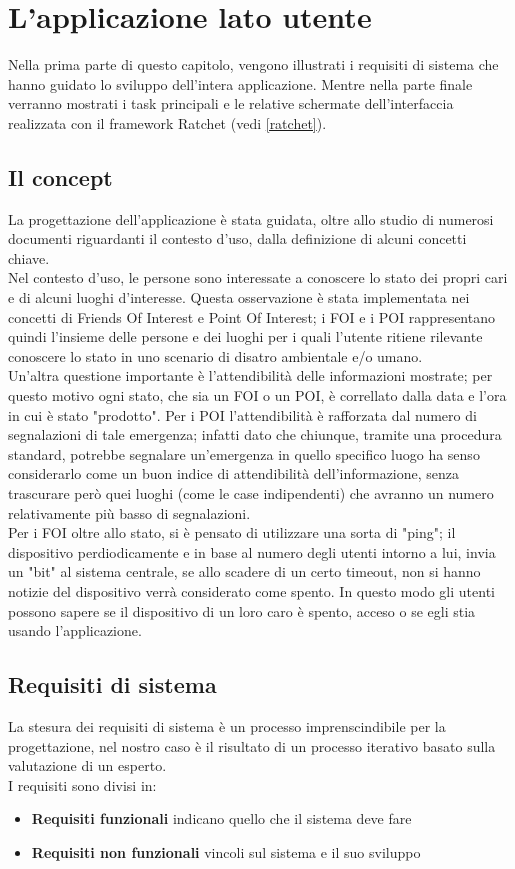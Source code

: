 \chapter{L'applicazione lato utente}
Nella prima parte di questo capitolo, vengono illustrati i requisiti di sistema che hanno guidato lo sviluppo dell'intera applicazione. Mentre nella parte finale verranno mostrati i task principali e le relative schermate dell'interfaccia realizzata con il framework Ratchet (vedi \ref{ratchet}).
\section{Il concept}
La progettazione dell'applicazione è stata guidata, oltre allo studio di numerosi documenti riguardanti il contesto d'uso, dalla definizione di alcuni concetti chiave. \\
Nel contesto d'uso, le persone sono interessate a conoscere lo stato dei propri cari e di alcuni luoghi d'interesse. Questa osservazione è stata implementata nei concetti di Friends Of Interest e Point Of Interest; i FOI e i POI rappresentano quindi l'insieme delle persone e dei luoghi per i quali l'utente ritiene rilevante conoscere lo stato in uno scenario di disatro ambientale e/o umano.\\
Un'altra questione importante è l'attendibilità delle informazioni mostrate; per questo motivo ogni stato, che sia un FOI o un POI, è correllato dalla data e l'ora in cui è stato "prodotto". Per i POI l'attendibilità è rafforzata dal numero di segnalazioni di tale emergenza; infatti dato che chiunque, tramite una procedura standard, potrebbe segnalare un'emergenza in quello specifico luogo ha senso considerarlo come un buon indice di attendibilità dell'informazione, senza trascurare però quei luoghi (come le case indipendenti) che avranno un numero relativamente più basso di segnalazioni.\\
Per i FOI oltre allo stato, si è pensato di utilizzare una sorta di "ping";  il dispositivo perdiodicamente e in base al numero degli utenti intorno a lui, invia un "bit" al sistema centrale, se allo scadere di un certo timeout, non si hanno notizie del dispositivo verrà considerato come spento. In questo modo gli utenti possono sapere se il dispositivo di un loro caro è spento, acceso o se egli stia usando l'applicazione. 

\section{Requisiti di sistema}
La stesura dei requisiti di sistema è un processo imprenscindibile per la progettazione, nel nostro caso è il risultato di un processo iterativo basato sulla valutazione di un esperto.\\
I requisiti sono divisi in:
\begin{itemize}
\item \textbf{Requisiti funzionali} indicano quello che il sistema deve fare
\item \textbf{Requisiti non funzionali} vincoli sul sistema e il suo sviluppo
\end{itemize}
 

